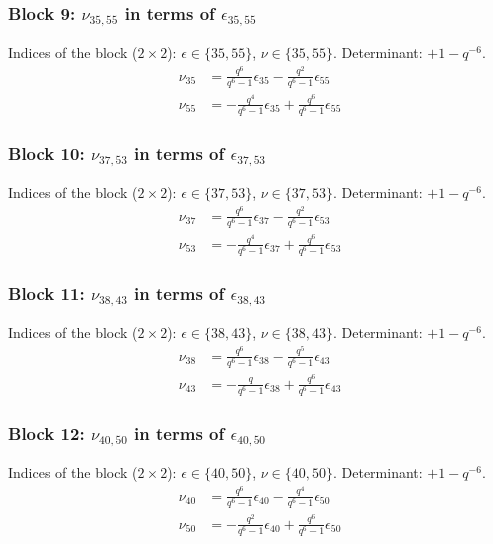 \subsubsection{Block 9: $\nu_{35, 55}$ in terms of $\epsilon_{35, 55}$}
Indices of the block ($2\times 2$): $\epsilon \in \{35, 55\}$, $\nu \in \{35, 55\}$.
Determinant: $+1-q^{-6}$.
\begin{align*}
\nu_{35} &= \frac{q^{6}}{q^{6}-1}\epsilon_{35} - \frac{q^{2}}{q^{6}-1}\epsilon_{55}\\
\nu_{55} &= -\frac{q^{4}}{q^{6}-1}\epsilon_{35} + \frac{q^{6}}{q^{6}-1}\epsilon_{55}
\end{align*}

\subsubsection{Block 10: $\nu_{37, 53}$ in terms of $\epsilon_{37, 53}$}
Indices of the block ($2\times 2$): $\epsilon \in \{37, 53\}$, $\nu \in \{37, 53\}$.
Determinant: $+1-q^{-6}$.
\begin{align*}
\nu_{37} &= \frac{q^{6}}{q^{6}-1}\epsilon_{37} - \frac{q^{2}}{q^{6}-1}\epsilon_{53}\\
\nu_{53} &= -\frac{q^{4}}{q^{6}-1}\epsilon_{37} + \frac{q^{6}}{q^{6}-1}\epsilon_{53}
\end{align*}

\subsubsection{Block 11: $\nu_{38, 43}$ in terms of $\epsilon_{38, 43}$}
Indices of the block ($2\times 2$): $\epsilon \in \{38, 43\}$, $\nu \in \{38, 43\}$.
Determinant: $+1-q^{-6}$.
\begin{align*}
\nu_{38} &= \frac{q^{6}}{q^{6}-1}\epsilon_{38} - \frac{q^{5}}{q^{6}-1}\epsilon_{43}\\
\nu_{43} &= -\frac{q}{q^{6}-1}\epsilon_{38} + \frac{q^{6}}{q^{6}-1}\epsilon_{43}
\end{align*}

\subsubsection{Block 12: $\nu_{40, 50}$ in terms of $\epsilon_{40, 50}$}
Indices of the block ($2\times 2$): $\epsilon \in \{40, 50\}$, $\nu \in \{40, 50\}$.
Determinant: $+1-q^{-6}$.
\begin{align*}
\nu_{40} &= \frac{q^{6}}{q^{6}-1}\epsilon_{40} - \frac{q^{4}}{q^{6}-1}\epsilon_{50}\\
\nu_{50} &= -\frac{q^{2}}{q^{6}-1}\epsilon_{40} + \frac{q^{6}}{q^{6}-1}\epsilon_{50}
\end{align*}

